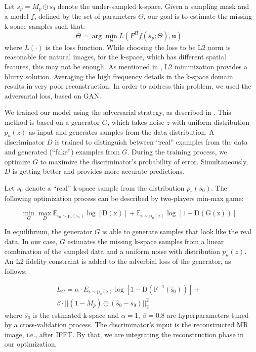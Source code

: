 \documentclass[review]{elsarticle}
\begin{document}
Let $s_{p}=M_{p}\odot s_{0}$ denote the under-sampled k-space. Given
a sampling mask and a model $f$, defined by the set of parameters
$\Theta$, our goal is to estimate the missing k-space samples such
that: 
\begin{equation}
\Theta=\arg\min_{\Theta}L(F^{H}f\left(s_{p};\Theta\right),\boldsymbol{u})
\end{equation}
where $L\left(\cdot\right)$ is the loss function. While choosing
the loss to be L2 norm is reasonable for natural images, for the k-space,
which has different spatial features, this may not be enough. As mentioned
in \cite{pathak2016context}, L2 minimization provides a blurry solution.
Averaging the high frequency details in the k-space domain results
in very poor reconstruction. In order to address this problem, we
used the adversarial loss, based on GAN.

We trained our model using the adversarial strategy, as described
in \cite{goodfellow2014generative,radford2015unsupervised}. This
method is based on a generator $G$, which takes noise \textbf{$z$
}with uniform distribution \textbf{$p_{u}\left(z\right)$} as input
and generates samples from the data distribution. A discriminator
$D$ is trained to distinguish between ``real'' examples from the
data and generated (``fake'') examples from $G.$ During the training
process, we optimize $G$ to maximize the discriminator's probability
of error. Simultaneously, $D$ is getting better and provides more
accurate predictions.

Let $s_{0}$ denote a ``real'' k-space sample from the distribution
$p_{r}\left(s_{0}\right)$. The following optimization process can
be described by two-players min-max game:

\begin{equation}
\min_{G}\max_{D}\mathbb{E_{\mathrm{s_{0}\sim p_{r}\left(s_{0}\right)}}\mathrm{\log\left[D\left(x\right)\right]}}+\mathbb{E_{\mathrm{z\sim p_{u}\left(z\right)}}\mathrm{\log\left[1-D\left(G(z)\right)\right]}}
\end{equation}

In equilibrium, the generator $G$ is able to generate samples that
look like the real data. In our case, $G$ estimates the missing k-space
samples from a linear combination of the sampled data and a uniform
noise with distribution $p_{u}\left(z\right)$. An L2 fidelity constraint
is added to the adverbial loss of the generator, as follows:

\begin{equation}
\begin{aligned}L_{G}=\alpha\cdot E_{\mathrm{z\sim p_{u}\left(z\right)}}\mathrm{\log\left[1-D\left(F^{-1}\left(\hat{s}_{0}\right)\right)\right]}+\\
\beta\cdot||\left(1-M_{p}\right)\odot\left(\hat{s}_{0}-s_{0}\right)||_{2}^{2}
\end{aligned}
\end{equation}
where $\hat{s}_{0}$ is the estimated k-space and $\alpha=1,\,\beta=0.8$
are hyperparameters tuned by a cross-validation process. The discriminator's
input is the reconstructed MR image,\textbf{ }i.e.,\textbf{ }after
IFFT. By that, we are integrating the reconstruction phase in our
optimization.
\end{document}
